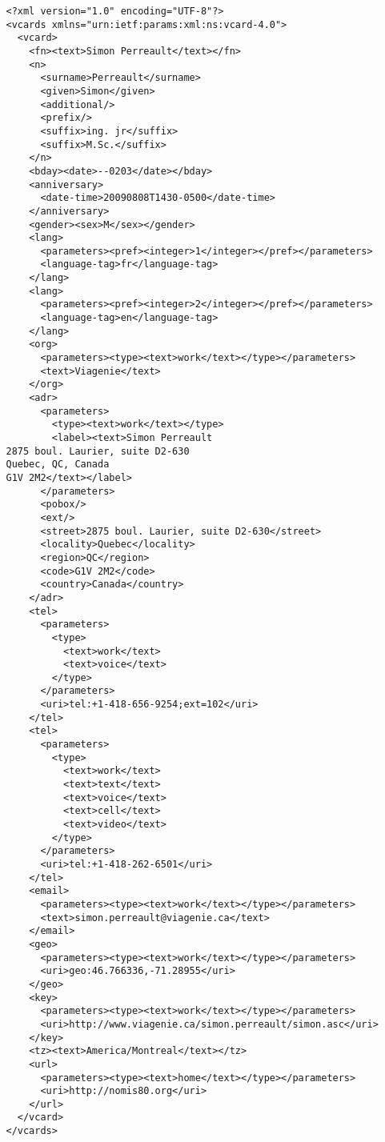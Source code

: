 \documentclass[12pt,a4paper]{scrartcl}		%
\begin{document}
\begin{verbatim}
   <?xml version="1.0" encoding="UTF-8"?>
   <vcards xmlns="urn:ietf:params:xml:ns:vcard-4.0">
     <vcard>
       <fn><text>Simon Perreault</text></fn>
       <n>
         <surname>Perreault</surname>
         <given>Simon</given>
         <additional/>
         <prefix/>
         <suffix>ing. jr</suffix>
         <suffix>M.Sc.</suffix>
       </n>
       <bday><date>--0203</date></bday>
       <anniversary>
         <date-time>20090808T1430-0500</date-time>
       </anniversary>
       <gender><sex>M</sex></gender>
       <lang>
         <parameters><pref><integer>1</integer></pref></parameters>
         <language-tag>fr</language-tag>
       </lang>
       <lang>
         <parameters><pref><integer>2</integer></pref></parameters>
         <language-tag>en</language-tag>
       </lang>
       <org>
         <parameters><type><text>work</text></type></parameters>
         <text>Viagenie</text>
       </org>
       <adr>
         <parameters>
           <type><text>work</text></type>
           <label><text>Simon Perreault
   2875 boul. Laurier, suite D2-630
   Quebec, QC, Canada
   G1V 2M2</text></label>
         </parameters>
         <pobox/>
         <ext/>
         <street>2875 boul. Laurier, suite D2-630</street>
         <locality>Quebec</locality>
         <region>QC</region>
         <code>G1V 2M2</code>
         <country>Canada</country>
       </adr>
       <tel>
         <parameters>
           <type>
             <text>work</text>
             <text>voice</text>
           </type>
         </parameters>
         <uri>tel:+1-418-656-9254;ext=102</uri>
       </tel>
       <tel>
         <parameters>
           <type>
             <text>work</text>
             <text>text</text>
             <text>voice</text>
             <text>cell</text>
             <text>video</text>
           </type>
         </parameters>
         <uri>tel:+1-418-262-6501</uri>
       </tel>
       <email>
         <parameters><type><text>work</text></type></parameters>
         <text>simon.perreault@viagenie.ca</text>
       </email>
       <geo>
         <parameters><type><text>work</text></type></parameters>
         <uri>geo:46.766336,-71.28955</uri>
       </geo>
       <key>
         <parameters><type><text>work</text></type></parameters>
         <uri>http://www.viagenie.ca/simon.perreault/simon.asc</uri>
       </key>
       <tz><text>America/Montreal</text></tz>
       <url>
         <parameters><type><text>home</text></type></parameters>
         <uri>http://nomis80.org</uri>
       </url>
     </vcard>
   </vcards>
\end{verbatim}
\end{document}
